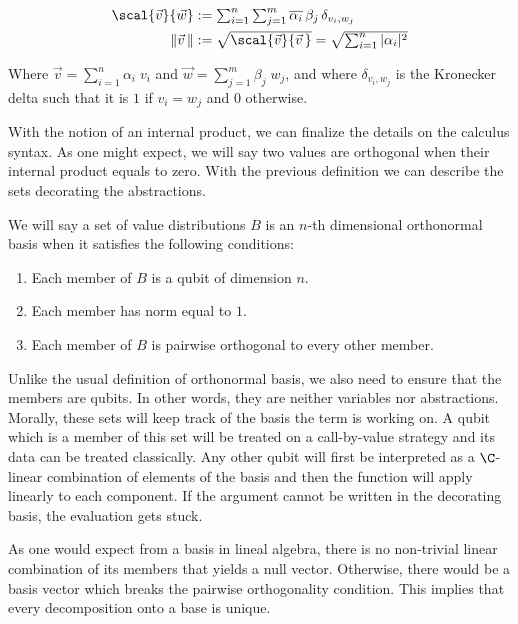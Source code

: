 \begin{align*}
  \textstyle\scal{\vec{v}}{\vec{w}}&:=\textstyle\sum_{i=1}^n\sum_{j=1}^m\overline{\alpha_i}\,\beta_j\,\delta_{v_i,w_j}\\
  \textstyle\|\vec{v}\,\|&:=\textstyle\sqrt{\scal{\vec{v}}{\vec{v}\,}}=\textstyle\sqrt{\sum_{i=1}^n|\alpha_i|^2}    
\end{align*}

Where $\vec{v}=\sum_{i=1}^n\alpha_i\; v_i$ and $\vec{w}=\sum_{j=1}^m\beta_j\; w_j$, and where $\delta_{v_i,w_j}$ is the Kronecker delta such that it is $1$ if $v_i=w_j$ and $0$ otherwise.

With the notion of an internal product, we can finalize the details on the calculus syntax. As one might expect, we will say two values are orthogonal when their internal product equals to zero. With the previous definition we can describe the sets decorating the abstractions.

\begin{definition}\label{def:NthDimensionalBasis}
We will say a set of value distributions $B$ is an $n$-th dimensional orthonormal basis when it satisfies the following conditions:
\begin{enumerate}
  \item Each member of $B$ is a qubit of dimension $n$.
  \item Each member has norm equal to $1$.
  \item Each member of $B$ is pairwise orthogonal to every other member. 
\end{enumerate}
\end{definition}

Unlike the usual definition of orthonormal basis, we also need to ensure that the members are qubits. In other words, they are neither variables nor abstractions. Morally, these sets will keep track of the basis the term is working on. A qubit which is a member of this set will be treated on a call-by-value strategy and its data can be treated classically. Any other qubit will first be interpreted as a $\C$-linear combination of elements of the basis and then the function will apply linearly to each component. If the argument cannot be written in the decorating basis, the evaluation gets stuck. 

As one would expect from a basis in lineal algebra, there is no non-trivial linear combination of its members that yields a null vector. Otherwise, there would be a basis vector which breaks the pairwise orthogonality condition. This implies that every decomposition onto a base is unique.

